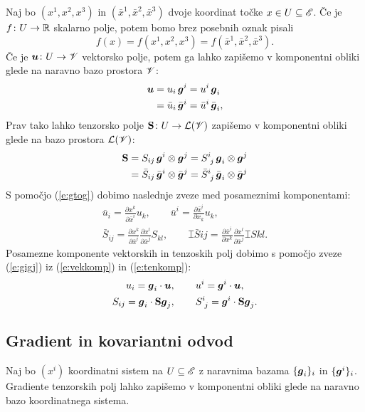 Naj bo $(x^1,x^2,x^3)$ in $(\bar{x}^1,\bar{x}^2,\bar{x}^3)$ dvoje koordinat točke $x\in U\subseteq\mathscr E$.
Če je $f\colon U\to\mathbb R$ skalarno polje, potem bomo brez posebnih oznak pisali
\[ f(x)=f(x^1,x^2,x^3)=f(\bar{x}^1,\bar{x}^2,\bar{x}^3). \]
Če je $\boldsymbol u\colon U\to\mathscr V$ vektorsko polje, potem ga lahko zapišemo v komponentni
obliki glede na naravno bazo prostora $\mathscr V$:
\begin{align}
	\boldsymbol u&=u_i\,\boldsymbol g^i=u^i\,\boldsymbol g_i \nonumber \\
	&=\bar{u}_i\,\bar{\boldsymbol g}^i=\bar{u}^i\,\bar{\boldsymbol g}_i, \label{e:vekkomp}
\end{align}
Prav tako lahko tenzorsko polje $\mathbf S\colon U\to\mathcal L(\mathscr V)$ zapišemo v
komponentni obliki glede na bazo prostora $\mathcal L(\mathscr V)$:
\begin{align}
	\ten{S}&=S_{ij}\,\vek{g}^i\otimes\vek{g}^j=\topbot{S}{i}{j}\,\vek{g}_i\otimes\vek{g}^j \nonumber \\
	&=\bar{S}_{ij}\,\bar{\vek{g}}^i\otimes\bar{\vek{g}}^j=
	\topbot{\bar{S}}{i}{j}\,\bar{\vek{g}}_i\otimes\bar{\vek{g}}^j \label{e:tenkomp}
\end{align}
S pomočjo (\ref{e:gtog}) dobimo naslednje zveze med posameznimi komponentami:
\begin{gather*}
	\bar{u}_i=\frac{\partial x^k}{\partial\bar{x}^i}u_k, \qquad
	\bar{u}^i=\frac{\partial\bar{x}^i}{\partial x_k}u_k, \\
	\bar{S}_{ij}=\frac{\partial x^k}{\partial\bar{x}^i}\frac{\partial x^l}{\partial\bar{x}^j}S_{kl}, \qquad
	\topbot{\bar{S}}{i}{j}=\frac{\partial\bar{x}^i}{\partial x^k}\frac{\partial x^l}{\partial\bar{x}^j}\topbot{S}{k}{l}.
\end{gather*}
Posamezne komponente vektorskih in tenzoskih polj dobimo s pomočjo zveze (\ref{e:gigj})
iz (\ref{e:vekkomp}) in (\ref{e:tenkomp}):
\begin{gather}
	u_i=\vek{g}_i\cdot\vek{u},\qquad u^i=\vek{g}^i\cdot\vek{u}, \label{e:kompvek} \\
	S_{ij}=\vek{g}_i\cdot\ten{S}\vek{g}_j,\qquad\topbot{S}{i}{j}=\vek{g}^i\cdot\ten{S}\vek{g}_j.\label{e:kompten}
\end{gather}


\subsection{Gradient in kovariantni odvod}


Naj bo $(x^i)$ koordinatni sistem na $U\subseteq\mathscr E$ z naravnima bazama $\{\boldsymbol g_i\}_i$ in $\{\boldsymbol g^i\}_i$.
Gradiente tenzorskih polj lahko zapišemo v komponentni obliki glede na naravno bazo koordinatnega sistema.

